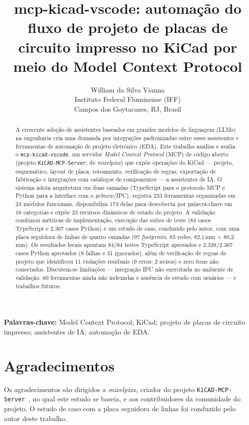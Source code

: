 \documentclass[11pt,a4paper]{article}
\title{\textbf{mcp-kicad-vscode: automação do fluxo de projeto de placas de
circuito impresso no KiCad por meio do Model Context Protocol}}
\author{
  William da Silva Vianna\\
  \small Instituto Federal Fluminense (IFF)\\
  \small Campos dos Goytacazes, RJ, Brasil
}
\date{}
\begin{document}
\maketitle

\begin{abstract}
\noindent
A crescente adoção de assistentes baseados em grandes modelos de linguagem
(LLMs) na engenharia cria uma demanda por integrações padronizadas entre esses
assistentes e ferramentas de automação de projeto eletrônico (EDA). Este
trabalho analisa e avalia o \texttt{mcp-kicad-vscode}, um servidor
\emph{Model Context Protocol} (MCP) de código aberto (projeto
\texttt{KiCAD-MCP-Server}, de \emph{mixelpixx}) que expõe operações do KiCad
--- projeto, esquemático, layout de placa, roteamento, verificação de regras,
exportação de fabricação e integrações com catálogos de componentes --- a
assistentes de IA. O sistema adota arquitetura em duas camadas (TypeScript
para o protocolo MCP e
Python para a interface com o \emph{pcbnew}/IPC), registra 233 ferramentas
organizadas em 24 módulos funcionais, disponibiliza 173 delas para descoberta
por palavra-chave em 16 categorias e expõe 23 recursos dinâmicos de estado do
projeto. A validação combinou métricas de implementação, execução das suítes de
teste (84 casos TypeScript e 2.367 casos Python) e um estudo de caso, conduzido
pelo autor, com uma placa seguidora de linhas de quatro camadas
(97 \emph{footprints}, 83 redes, 82,1\,mm $\times$ 80,2\,mm). Os resultados
locais apontam 84/84 testes
TypeScript aprovados e 2.328/2.367 casos Python aprovados (8 falhas e 31
ignorados), além de verificação de regras de projeto que identificou 11
violações residuais (9 erros; 2 avisos) e zero itens não conectados. Discutem-se
limitações --- integração IPC não exercitada no ambiente de validação, 60
ferramentas ainda não indexadas e ausência de estudo com usuários --- e
trabalhos futuros.
\end{abstract}

\noindent\textbf{Palavras-chave:} Model Context Protocol; KiCad; projeto de
placas de circuito impresso; assistentes de IA; automação de EDA.








\section*{Agradecimentos}
Os agradecimentos são dirigidos a \emph{mixelpixx}, criador do projeto
\texttt{KiCAD-MCP-Server}~\citep{kicadmcpserver}, no qual este estudo se
baseia, e aos contribuidores da comunidade do projeto. O estudo de caso com a
placa seguidora de linhas foi conduzido pelo autor deste trabalho.



\end{document}
